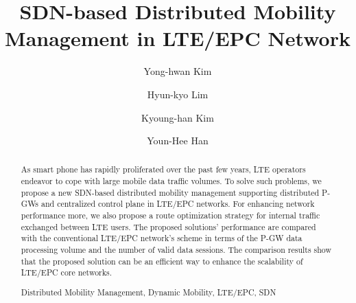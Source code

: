 \documentclass[runningheads,a4paper]{llncs}
\newcommand{\keywords}[1]{\par\addvspace\baselineskip
\noindent\keywordname\enspace\ignorespaces#1}
\begin{document}
\mainmatter  %

\title{SDN-based Distributed Mobility Management in LTE/EPC Network}


%
%

\author{Yong-hwan Kim\inst{}
\and Hyun-kyo Lim\inst{}
\and Kyoung-han Kim\inst{}
\and Youn-Hee Han\inst{}}
%


%
%

\maketitle


\begin{abstract}
As smart phone has rapidly proliferated over the past few years, LTE operators endeavor to cope with large mobile data traffic volumes.  To solve such problems, we propose a new SDN-based distributed mobility management supporting distributed P-GWs and centralized control plane in LTE/EPC networks. For enhancing network performance more, we also propose a route optimization strategy for internal traffic exchanged between LTE users. The proposed solutions' performance are compared with the conventional LTE/EPC network's scheme in terms of the P-GW data processing volume and the number of valid data sessions. The comparison results show that the proposed solution can be an efficient way to enhance the scalability of LTE/EPC core networks.

\keywords{Distributed Mobility Management, Dynamic Mobility, LTE/EPC, SDN}
\end{abstract}
\end{document}
